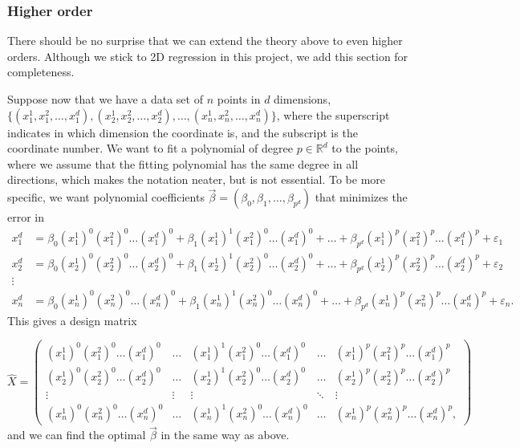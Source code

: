 \subsubsection{Higher order}
There should be no surprise that we can extend the theory above to even higher orders. 
Although we stick to 2D regression in this project, we add this section for completeness. 

Suppose now that we have a data set of $n$ points in $d$ dimensions, \\ $\{(x_1^1, x_1^2, \hdots, x_1^d), (x_2^1, x_2^2,\hdots, x_2^d),\hdots, (x_n^1, x_n^2,\hdots,x_n^d)\}$, where the superscript indicates in which dimension the coordinate is, and the subscript is the coordinate number. We want to fit a polynomial of degree $p\in\mathbb{R}^d$ to the points, where we assume that the fitting polynomial has the same degree in all directions, which makes the notation neater, but is not essential. To be more specific, we want polynomial coefficients $\vec{\beta}=(\beta_0, \beta_1, \hdots, \beta_{p^d})$ that minimizes the error in 
\begin{align*}
x_1^d&=\beta_0(x_1^1)^0(x_1^2)^0\hdots(x_1^d)^0 +\beta_1(x_1^1)^1(x_1^2)^0\hdots(x_1^d)^0+\hdots+\beta_{p^d}(x_1^1)^p(x_1^2)^p\hdots(x_1^d)^p+\varepsilon_1\\
x_2^d&=\beta_0(x_2^1)^0(x_2^2)^0\hdots(x_2^d)^0 +\beta_1(x_2^1)^1(x_2^2)^0\hdots(x_2^d)^0+\hdots+\beta_{p^d}(x_2^1)^p(x_2^2)^p\hdots(x_2^d)^p+\varepsilon_2\\
\vdots\\
x_n^d&=\beta_0(x_n^1)^0(x_n^2)^0\hdots(x_n^d)^0 +\beta_1(x_n^1)^1(x_n^2)^0\hdots(x_n^d)^0+\hdots+\beta_{p^d}(x_n^1)^p(x_n^2)^p\hdots(x_n^d)^p+\varepsilon_n.
\end{align*}
This gives a design matrix

\begin{equation}
\hat{X}=
\begin{pmatrix}
(x_1^1)^0(x_1^2)^0\hdots(x_1^d)^0&\hdots& (x_1^1)^1(x_1^2)^0\hdots(x_1^d)^0&\hdots&(x_1^1)^p(x_1^2)^p\hdots(x_1^d)^p\\
(x_2^1)^0(x_2^2)^0\hdots(x_2^d)^0&\hdots& (x_2^1)^1(x_2^2)^0\hdots(x_2^d)^0&\hdots&(x_2^1)^p(x_2^2)^p\hdots(x_2^d)^p\\
\vdots&\vdots&\vdots&\ddots&\vdots\\
(x_n^1)^0(x_n^2)^0\hdots(x_n^d)^0&\hdots& (x_n^1)^1(x_n^2)^0\hdots(x_n^d)^0&\hdots&(x_n^1)^p(x_n^2)^p\hdots(x_n^d)^p,
\end{pmatrix}
\end{equation}
and we can find the optimal $\vec{\beta}$ in the same way as above. 

